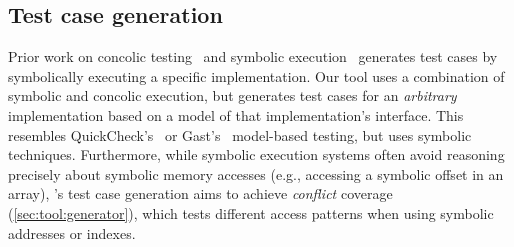 
\subsection{Test case generation}

Prior work on concolic testing~\cite{godefroid:dart,sen:cute}
and symbolic execution~\cite{cadar:exe,cadar:klee} generates test
cases by symbolically executing a specific implementation.
%
Our \tool tool uses a combination of symbolic and concolic execution, but
generates
test cases for an {\em arbitrary} implementation based on a model
of that implementation's interface.  This resembles
QuickCheck's~\cite{claessen:quickcheck} or Gast's~\cite{koopman:gast}
model-based testing, but uses symbolic techniques.
%
Furthermore, while symbolic execution systems
often avoid reasoning precisely about symbolic memory accesses (e.g.,
accessing a symbolic offset in an array),
\tool's test case generation aims to achieve \emph{conflict} coverage
(\cref{sec:tool:generator}), which tests different access
patterns when using symbolic addresses or indexes.

